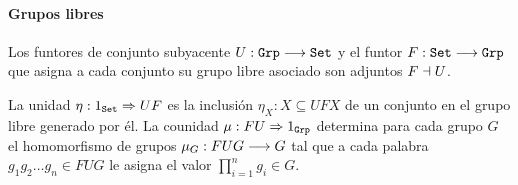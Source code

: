 \paragraph{Grupos libres}
Los funtores de conjunto subyacente $U : \texttt{Grp}\longrightarrow \texttt{Set}$ y el funtor
$F : \texttt{Set}\longrightarrow \texttt{Grp}$ que asigna a cada conjunto su grupo libre asociado
son adjuntos $F \dashv U$.

La unidad $\eta : 1_{\texttt{Set}}\Rightarrow UF$ es la inclusión
$\eta_X : X \subseteq UFX$ de un conjunto en el
grupo libre generado por él. La counidad
$\mu : FU\Rightarrow 1_{\texttt{Grp}}$ determina para cada grupo $G$
el homomorfismo de grupos $\mu_G : FUG\longrightarrow G$
tal que a cada palabra
$g_1g_2\ldots g_n \in FUG$ le asigna el valor $\prod_{i=1}^n g_i \in G$.
